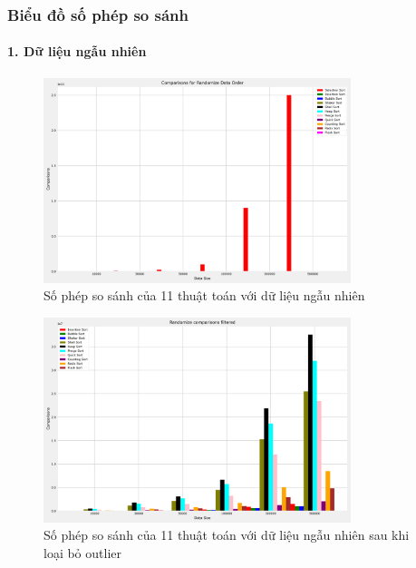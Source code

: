 \subsubsection{Biểu đồ số phép so sánh}


\paragraph{1. Dữ liệu ngẫu nhiên}
\begin{figure}[H]
    \centering
    \includegraphics[width=0.8\textwidth]{exprimental_result/images/randomize_comparisons.png}
    \caption{Số phép so sánh của 11 thuật toán với dữ liệu ngẫu nhiên}
\end{figure}

\begin{figure}[H]
    \centering
    \includegraphics[width=0.8\textwidth]{exprimental_result/images/randomize_comparisons_filtered.png}
    \caption{Số phép so sánh của 11 thuật toán với dữ liệu ngẫu nhiên sau khi loại bỏ outlier}
\end{figure}



